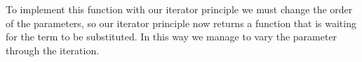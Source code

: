 \documentclass{entcs}
\begin{document}
To implement this function with our iterator principle we must change the order of the parameters, so our iterator principle now returns a function that is waiting for the term to be substituted. In this way we manage to vary the parameter through the iteration.


\begin{code}%
\> \AgdaSymbol{:}       \<%
\\
\>      \<%
\\
\> \AgdaSymbol{|}  \AgdaSymbol{\_} \AgdaSymbol{=} \<%
\\
\> \AgdaSymbol{|}  \<[10]%
\>[10]\AgdaSymbol{\_} \AgdaSymbol{=}  \AgdaBound{\_}  \AgdaSymbol{(} \AgdaSymbol{)}\<%
\\
\>\AgdaComment{--}\<%
\\
\> \AgdaSymbol{:}       \<%
\\
\>    \AgdaSymbol{=}  \<[18]%
\>[18]\AgdaSymbol{(}  \AgdaSymbol{)} \<[26]%
\>[26]\<%
\\
\>[2]\<[18]%
\>[18]\AgdaSymbol{(} \AgdaSymbol{)} \<[27]%
\>[27]\<%
\\
\>[2]\<[18]%
\>[18]     \<[30]%
\>[30]    \AgdaSymbol{)} \<[41]%
\>[41]\<%
\\
\>[2]\<[18]%
\>[18]\AgdaSymbol{(}      \AgdaInductiveConstructor{,}        \AgdaSymbol{(} \AgdaSymbol{((} \AgdaSymbol{)}  \AgdaSymbol{)))} \<[65]%
\>[65]\<%
\\
\>[2]\<[18]%
\>[18] \<%
\end{code}
\end{document}
